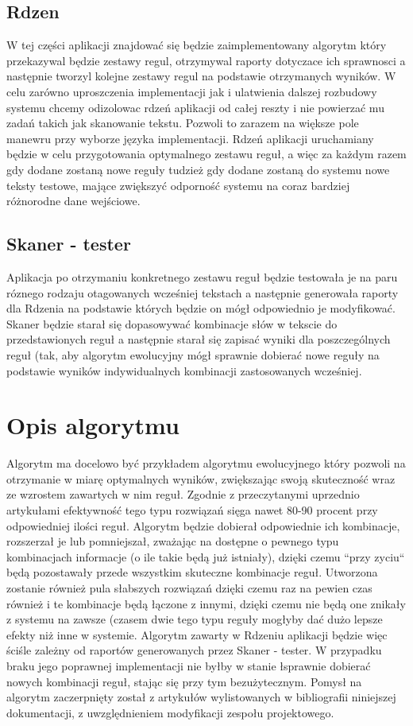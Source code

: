 \documentclass[12pt]{article}
\begin{document}
\subsection{Rdzen}
W tej części aplikacji znajdować się będzie zaimplementowany algorytm który przekazywal będzie zestawy regul, otrzymywal raporty dotyczace ich sprawnosci a następnie tworzyl kolejne zestawy regul na podstawie otrzymanych wyników. 
W celu zarówno uproszczenia implementacji jak i ulatwienia dalszej rozbudowy systemu chcemy odizolowac rdzeń aplikacji od całej reszty i nie powierzać mu zadań takich jak skanowanie tekstu. Pozwoli to zarazem na większe pole manewru przy wyborze języka implementacji.
Rdzeń aplikacji uruchamiany będzie w celu przygotowania optymalnego zestawu reguł, a więc za każdym razem gdy dodane zostaną nowe reguły tudzież gdy dodane zostaną do systemu nowe teksty testowe, mające zwiększyć odporność systemu na coraz bardziej różnorodne dane wejściowe.
\subsection{Skaner - tester}
Aplikacja po otrzymaniu konkretnego zestawu reguł będzie testowała je na paru róznego rodzaju otagowanych wcześniej tekstach a następnie generowała raporty dla Rdzenia na podstawie których będzie on mógł odpowiednio je modyfikować.
Skaner będzie starał się dopasowywać kombinacje słów w tekscie do przedstawionych reguł a następnie starał się zapisać wyniki dla poszczególnych reguł (tak, aby algorytm ewolucyjny mógł sprawnie dobierać nowe reguły na podstawie wyników indywidualnych kombinacji zastosowanych wcześniej.
\section{Opis algorytmu}
Algorytm ma docelowo być przykładem algorytmu ewolucyjnego który pozwoli na otrzymanie w miarę optymalnych wyników, zwiększając swoją skuteczność wraz ze wzrostem zawartych w nim reguł.
Zgodnie z przeczytanymi uprzednio artykułami efektywność tego typu rozwiązań sięga nawet 80-90 procent przy odpowiedniej ilości reguł. 
Algorytm będzie dobierał odpowiednie ich kombinacje, rozszerzał je lub pomniejszał, zważając na dostępne o pewnego typu kombinacjach informacje (o ile takie będą już istniały), dzięki czemu ``przy zyciu`` będą pozostawały przede wszystkim skuteczne kombinacje reguł. 
Utworzona zostanie również pula słabszych rozwiązań dzięki czemu raz na pewien czas również i te kombinacje będą łączone z innymi, dzięki czemu nie będą one znikały z systemu na zawsze (czasem dwie tego typu reguły mogłyby dać dużo lepsze efekty niż inne w systemie.
Algorytm zawarty w Rdzeniu aplikacji będzie więc ściśle zależny od raportów generowanych przez Skaner - tester. W przypadku braku jego poprawnej implementacji nie byłby w stanie łsprawnie dobierać nowych kombinacji reguł, stając się przy tym bezużytecznym.
Pomysł na algorytm zaczerpnięty został z artykułów wylistowanych w bibliografii niniejszej dokumentacji, z uwzględnieniem modyfikacji zespołu projektowego.
\end{document}
